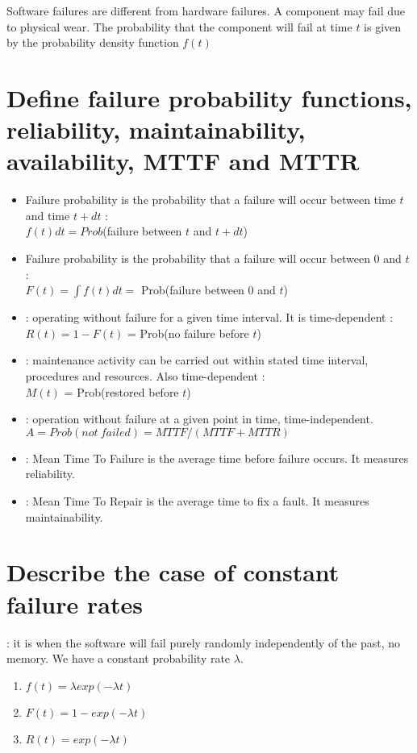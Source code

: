 Software failures are different from hardware failures. A component may fail due to physical wear. The probability that the component will fail at time $t$ is given by the probability density function $f(t)$

\section{Define failure probability functions, reliability, maintainability, availability, MTTF and MTTR}

\begin{itemize}
    \item Failure probability  is the probability that a failure will occur between time $t $and time $t+dt$ :\\
    $f(t)dt=Prob$(failure between $t$ and $t+dt$)
    \item Failure probability  is the probability that a failure will occur between 0 and $t$ :\\
    $F(t)=\int f(t)dt =$ Prob(failure between $0$ and $t$)
    \item {} : operating without failure for a given time interval. It is time-dependent :\\
    $R(t) = 1-F(t)$ = Prob(no failure before $t$)
    \item {} : maintenance activity can be carried out within stated time interval, procedures and resources. Also time-dependent :\\
    $M(t)$ = Prob(restored before $t$)
    \item {} : operation without failure at a given point in time, time-independent.\\
    $A=Prob(not \ failed)= MTTF/(MTTF+MTTR)$
    \item {} : Mean Time To Failure is the average time before failure occurs. It measures reliability.
    \item {} : Mean Time To Repair is the average time to fix a fault. It measures maintainability.
\end{itemize}

\section{Describe the case of constant failure rates}

: it is when the software will fail purely randomly independently of the past, no memory. We have a constant probability rate $\lambda$.
\begin{enumerate}
    \item $f(t)= \lambda exp(-\lambda t)$
    \item $F(t) = 1-exp(-\lambda t)$
    \item $R(t)= exp(-\lambda t)$
\end{enumerate} 

